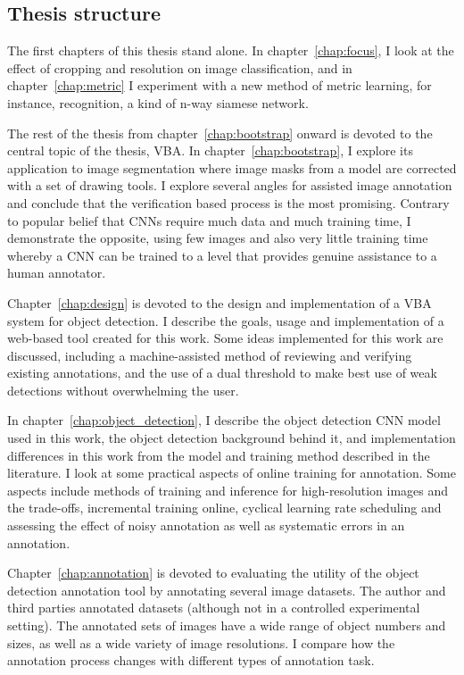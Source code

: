 \subsection {Thesis structure} 

The first chapters of this thesis stand alone. In chapter~\ref{chap:focus}, I look at the effect of cropping and resolution on image classification, and in chapter~\ref{chap:metric} I experiment with a new method of metric learning, for instance, recognition, a kind of n-way siamese network. 

The rest of the thesis from chapter~\ref{chap:bootstrap} onward is devoted to the central topic of the thesis, \gls{VBA}. In chapter~\ref{chap:bootstrap}, I explore its application to image segmentation where image masks from a model are corrected with a set of drawing tools. I explore several angles for assisted image annotation and conclude that the verification based process is the most promising. Contrary to popular belief that \gls{CNN}s require much data and much training time, I demonstrate the opposite,  using few images and also very little training time whereby a \gls{CNN} can be trained to a level that provides genuine assistance to a human annotator. 

Chapter~\ref{chap:design} is devoted to the design and implementation of a \gls{VBA} system for object detection. I describe the goals, usage and implementation of a web-based tool created for this work. Some ideas implemented for this work are discussed, including a machine-assisted method of reviewing and verifying existing annotations, and the use of a dual threshold to make best use of weak detections without overwhelming the user.

In chapter~\ref{chap:object_detection}, I describe the object detection \gls{CNN} model used in this work, the object detection background behind it, and implementation differences in this work from the model and training method described in the literature. I look at some practical aspects of online training for annotation. Some aspects include methods of training and inference for high-resolution images and the trade-offs, incremental training online, cyclical learning rate scheduling and assessing the effect of noisy annotation as well as systematic errors in an annotation. 

Chapter~\ref{chap:annotation} is devoted to evaluating the utility of the object detection annotation tool by annotating several image datasets. The author and third parties annotated datasets (although not in a controlled experimental setting). The annotated sets of images have a wide range of object numbers and sizes, as well as a wide variety of image resolutions. I compare how the annotation process changes with different types of annotation task. 

